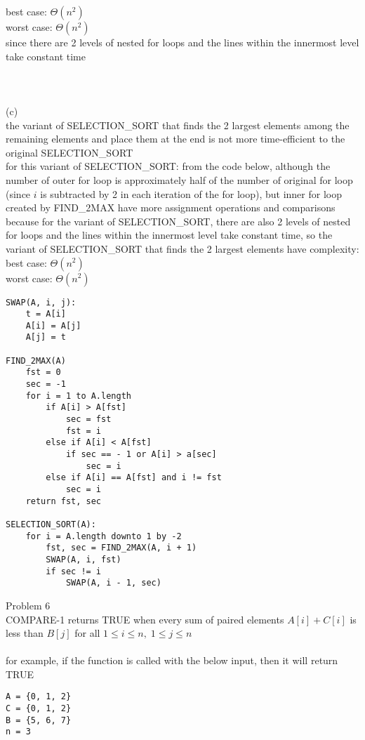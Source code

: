 \documentclass[12pt,border=4pt,multi]{article}%
\begin{document}
best case: $\Theta(n^2)$\\
worst case: $\Theta(n^2)$\\
since there are 2 levels of nested for loops and the lines within the innermost level take constant time
\\
\\
\\
\\
(c)\\
the variant of SELECTION\_SORT that finds the 2 largest elements among the remaining elements and place them at the end is not more time-efficient to the original SELECTION\_SORT\\
for this variant of SELECTION\_SORT: from the code below, although the number of outer for loop is approximately half of the number of original for loop (since $i$ is subtracted by 2 in each iteration of the for loop), but inner for loop created by FIND\_2MAX have more assignment operations and comparisons\\
because for the variant of SELECTION\_SORT, there are also 2 levels of nested for loops and the lines within the innermost level take constant time, so the variant of SELECTION\_SORT that finds the 2 largest elements have complexity:\\
best case: $\Theta(n^2)$\\
worst case: $\Theta(n^2)$\\
\begin{lstlisting}
SWAP(A, i, j):
    t = A[i]
    A[i] = A[j]
    A[j] = t
    
FIND_2MAX(A)
    fst = 0
    sec = -1
    for i = 1 to A.length
        if A[i] > A[fst]
            sec = fst
            fst = i
        else if A[i] < A[fst]
            if sec == - 1 or A[i] > a[sec]
                sec = i
        else if A[i] == A[fst] and i != fst
            sec = i 
    return fst, sec
    
SELECTION_SORT(A):
    for i = A.length downto 1 by -2
        fst, sec = FIND_2MAX(A, i + 1)
        SWAP(A, i, fst)
        if sec != i
            SWAP(A, i - 1, sec)
\end{lstlisting}
\newpage
\noindent
Problem 6\\
COMPARE-1 returns TRUE when every sum of paired elements $A[i] + C[i]$ is less than $B[j]$ for all $1 \leq i \leq n, \; 1 \leq j \leq n$\\
\\
for example, if the function is called with the below input, then it will return TRUE
\begin{lstlisting}
A = {0, 1, 2}
C = {0, 1, 2}
B = {5, 6, 7}
n = 3
\end{lstlisting}
\end{document}
